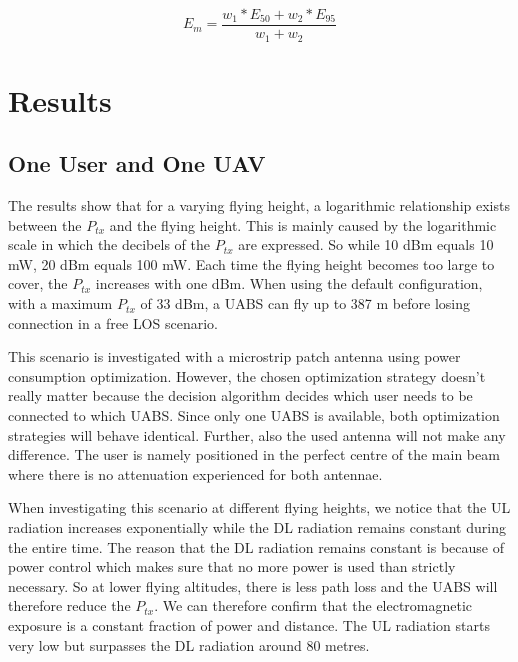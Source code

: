 \documentclass[twocolumn]{phdsymp} %
\begin{document}
\begin{equation} 
E_m = \frac{w_1 * E_{50} + w_2 * E_{95}}{w_1 + w_2}
\label{eq:em}
\end{equation}

\section{Results}
\subsection{One User and One \gls{UAV}}

The  results show that for a varying flying height, a logarithmic relationship exists between the $P_{tx}$ and the flying height. 
This is mainly caused by the logarithmic 
scale in which the decibels of the $P_{tx}$ are expressed. So while 10 dBm equals 10 mW, 20 dBm equals 100 mW. 
Each time the flying height becomes too large to cover, the 
$P_{tx}$ increases with one dBm. 
When using the default configuration, with a maximum $P_{tx}$ of 33 dBm,
a \gls{UABS} can fly up to 387 m before losing connection in a free \gls{LOS} scenario.

This scenario is investigated with a microstrip patch antenna using power consumption optimization. 
 However, the chosen optimization strategy doesn't really matter because the decision 
 algorithm decides which user 
needs to be connected to which \gls{UABS}. Since only one \gls{UABS} is available, both optimization strategies will behave identical.
Further, also the used antenna will not make any difference.
The user is namely positioned in the perfect centre of the main beam where there is 
no attenuation experienced for both antennae.

When investigating this scenario at different flying heights, we notice 
that the \gls{UL} radiation 
increases exponentially while 
the \gls{DL} radiation remains constant during the entire time. The reason that the \gls{DL} radiation
remains constant is because of power control which makes sure that no more power is used than strictly necessary. 
So at lower flying altitudes, there is less path loss and the \gls{UABS} 
will therefore reduce the $P_{tx}$. 
We can therefore confirm that the electromagnetic exposure is a constant fraction of power and distance.
The \gls{UL} radiation starts very low but surpasses the \gls{DL} radiation 
around 80 metres.
\end{document}
